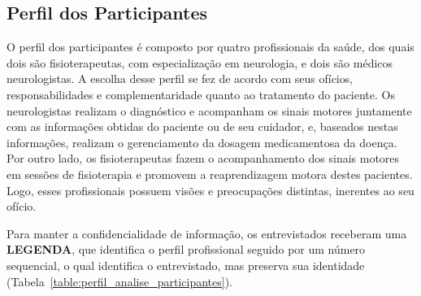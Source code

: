
	


\subsection{Perfil dos Participantes}
O perfil dos participantes é composto por quatro profissionais da saúde, dos quais dois são fisioterapeutas, com especialização em neurologia, e dois são médicos neurologistas. A escolha desse perfil se fez de acordo com seus ofícios, responsabilidades e complementaridade quanto ao tratamento do paciente. Os neurologistas realizam o diagnóstico e acompanham os sinais motores juntamente com as informações obtidas do paciente ou de seu cuidador, e, baseados nestas informações, realizam o gerenciamento da dosagem medicamentosa da doença. Por outro lado, os fisioterapeutas fazem o acompanhamento dos sinais motores em sessões de fisioterapia e promovem a reaprendizagem motora destes pacientes. Logo, esses profissionais possuem visões e preocupações distintas, inerentes ao seu ofício. 

Para manter a confidencialidade de informação, os entrevistados receberam uma \textbf{LEGENDA}, que identifica o perfil profissional seguido por um número sequencial, o qual identifica o entrevistado, mas preserva sua identidade (Tabela~\ref{table:perfil_analise_participantes}).

